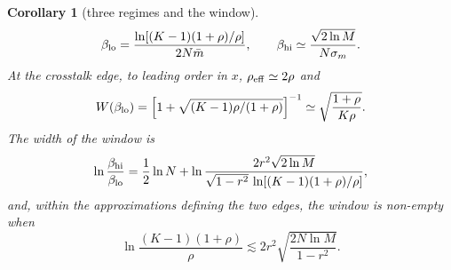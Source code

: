 \documentclass{SciPost}
\theoremstyle{plain}
\newtheorem{corollary}{Corollary}
\theoremstyle{definition}
\begin{document}
\begin{corollary}[three regimes and the window]
\begin{equation}
\beta_{\rm lo}=\frac{\ln[(K-1)(1+\rho)/\rho]}{2N\bar m},\qquad \beta_{\rm hi}\simeq\frac{\sqrt{2\ln M}}{N\sigma_m}.
\label{eq:window_emp}
\end{equation}
At the crosstalk edge, to leading order in $x$, $\rho_{\rm eff}\simeq2\rho$ and
\begin{equation*}
W(\beta_{\rm lo})=\Big[1+\sqrt{(K-1)\rho/(1+\rho)}\Big]^{-1}\simeq\sqrt{\frac{1+\rho}{K\rho}}.
\end{equation*}
The width of the window is
\begin{equation*}
\ln\frac{\beta_{\rm hi}}{\beta_{\rm lo}}=\frac12\ln N+\ln\frac{2r^2\sqrt{2\ln M}}{\sqrt{1-r^2}\,\ln[(K-1)(1+\rho)/\rho]},
\end{equation*}
and, within the approximations defining the two edges, the window is non-empty when
\begin{equation}
\ln\frac{(K-1)(1+\rho)}{\rho}\lesssim 2r^2\sqrt{\frac{2N\ln M}{1-r^2}}.
\label{eq:Kmax}
\end{equation}
\end{corollary}
\end{document}
